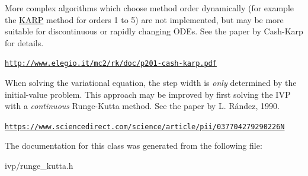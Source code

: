 More complex algorithms which choose method order dynamically (for example the \hyperlink{structKARP}{K\+A\+RP} method for orders 1 to 5) are not implemented, but may be more suitable for discontinuous or rapidly changing O\+D\+Es. See the paper by Cash-\/\+Karp for details.

\href{http://www.elegio.it/mc2/rk/doc/p201-cash-karp.pdf}{\tt http\+://www.\+elegio.\+it/mc2/rk/doc/p201-\/cash-\/karp.\+pdf}

When solving the variational equation, the step width is {\itshape only} determined by the initial-\/value problem. This approach may be improved by first solving the I\+VP with a {\itshape continuous} Runge-\/\+Kutta method. See the paper by L. Rández, 1990.

\href{https://www.sciencedirect.com/science/article/pii/037704279290226N}{\tt https\+://www.\+sciencedirect.\+com/science/article/pii/037704279290226N} 

The documentation for this class was generated from the following file\+:\begin{DoxyCompactItemize}
\item 
ivp/runge\+\_\+kutta.\+h\end{DoxyCompactItemize}
